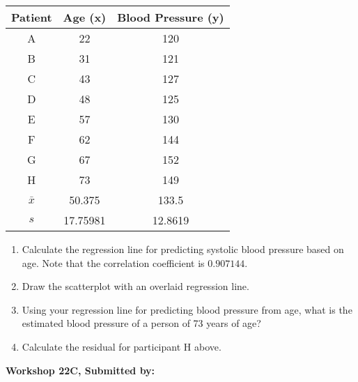 \documentclass[11pt]{book}\usepackage[]{graphicx}\usepackage[]{color}
\begin{document}
\begin{exercises}
\begin{exercise}
\begin{center}
\begin{tabular}{@{} ccc @{}} \hline
Patient &	Age (x)	& Blood Pressure (y) \\ \hline
A&	22&	120 \\
B&	31&	121 \\
C&	43&	127 \\
D&	48&	125 \\
E&	57&	130 \\
F&	62&	144 \\
G&	67&	152 \\
H&	73&	149 \\ \hline
$\bar{x}$ & 50.375 & 133.5 \\
$s$ & 17.75981 & 12.8619 \\ \hline
\end{tabular}
\end{center}

\begin{enumerate}
  \item Calculate the regression line for predicting systolic blood pressure based on age. Note that the correlation coefficient is $0.907144$.
	\item Draw the scatterplot with an overlaid regression line.
	\item Using your regression line for predicting blood pressure from age, what is the estimated blood pressure of a person of 73 years of age?
  \item Calculate the residual for participant H above.
\end{enumerate}

\end{exercise}
\begin{solution}  %

\end{solution}


\clearpage

    \begin{exercise}  %

    \begin{center}
\begin{flushleft}\textbf{\large \hfill Workshop 22C, Submitted by: }\end{flushleft}

\end{center}
\end{exercise}
\end{exercises}
\end{document}
